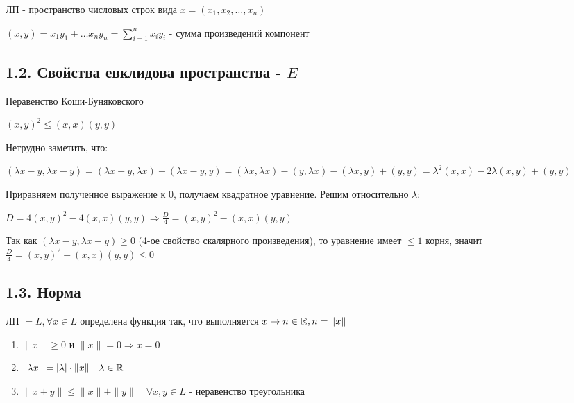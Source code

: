 \documentclass[12pt]{article}
\begin{document}
     ЛП - пространство числовых строк вида $x = (x_1, x_2, \dots, x_n)$

    $(x, y) = x_1 y_1 + \dots x_n y_n = \sum_{i=1}^n x_i y_i$ - сумма произведений компонент

    \subsection{1.2. Свойства евклидова пространства - $E$}

    \hypertarget{inequalityofCauchyBunyakovsky}{}

    \begin{MyTheorem}
        \Ths Неравенство Коши-Буняковского

        $(x, y)^2 \leq (x, x)(y, y)$
    \end{MyTheorem}

    \begin{MyProof}
        Нетрудно заметить, что:

        $(\lambda x - y, \lambda x - y) = (\lambda x - y, \lambda x) - (\lambda x - y, y) =
        (\lambda x, \lambda x) - (y, \lambda x) - (\lambda x, y) + (y, y) = \lambda^2 (x, x) - 2\lambda (x, y) + (y, y)$

        Приравняем полученное выражение к 0, получаем квадратное уравнение. Решим относительно $\lambda$:

        $D = 4(x, y)^2 - 4(x, x)(y, y) \Longrightarrow \frac{D}{4} = (x, y)^2 - (x, x)(y, y)$

        Так как $(\lambda x - y, \lambda x - y) \geq 0$ (4-ое свойство скалярного произведения), то уравнение имеет $\leq 1$ корня, значит
        $\frac{D}{4} = (x, y)^2 - (x, x)(y, y) \leq 0$
    \end{MyProof}

    \subsection{1.3. Норма}

    \hypertarget{normdefinition}{}

    ЛП $= L, \forall x \in L$ определена функция так, что выполняется $x \to n \in \mathbb{R}, n = \|x\|$

    \begin{enumerate}
        \item $\|x\| \geq 0$ и $\|x\| = 0 \Longrightarrow x = 0$
        \item $\|\lambda x\| = |\lambda| \cdot \|x\| \quad \lambda \in \mathbb{R}$
        \item $\|x + y\| \leq \|x\| + \|y\| \quad \forall x, y \in L$ - неравенство треугольника
    \end{enumerate}
\end{document}
